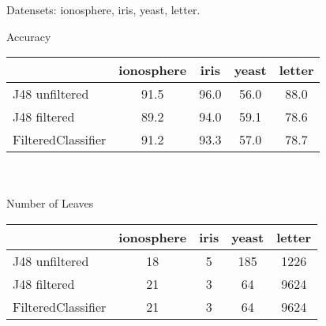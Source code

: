 Datensets: ionosphere, iris, yeast, letter.

Accuracy
\begin{tabular}{l|c|c|c|c}
	               & ionosphere & iris  & yeast & letter \\ \hline
J48 unfiltered     &  91.5      &  96.0 &  56.0 &  88.0  \\ \hline
J48 filtered       &  89.2      &  94.0 &  59.1 &  78.6  \\ \hline
FilteredClassifier &  91.2      &  93.3 &  57.0 &  78.7  \\ \hline
\end{tabular}\\ \\

Number of Leaves
\begin{tabular}{l|c|c|c|c}
	               & ionosphere & iris  & yeast & letter \\ \hline
J48 unfiltered     &  18        &  5    &  185  &  1226  \\ \hline
J48 filtered       &  21        &  3    &  64   &  9624  \\ \hline
FilteredClassifier &  21        &  3    &  64   &  9624  \\ \hline
\end{tabular}\\ \\

